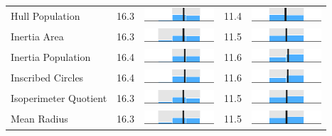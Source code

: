 \begin{table}
\begin{tabular}{l rm{7em} rm{7em}}
Hull Population        &  16.3 &       \includegraphics[width=7em]{mini_hist/IL_2008_hull_p} &  11.4 &       \includegraphics[width=7em]{mini_hist/IL_2016_hull_p} \\
Inertia Area           &  16.3 &    \includegraphics[width=7em]{mini_hist/IL_2008_inertia_a} &  11.5 &    \includegraphics[width=7em]{mini_hist/IL_2016_inertia_a} \\
Inertia Population     &  16.4 &    \includegraphics[width=7em]{mini_hist/IL_2008_inertia_p} &  11.6 &    \includegraphics[width=7em]{mini_hist/IL_2016_inertia_p} \\
Inscribed Circles      &  16.4 &    \includegraphics[width=7em]{mini_hist/IL_2008_ehrenburg} &  11.6 &    \includegraphics[width=7em]{mini_hist/IL_2016_ehrenburg} \\
Isoperimeter Quotient  &  16.3 &       \includegraphics[width=7em]{mini_hist/IL_2008_polsby} &  11.5 &       \includegraphics[width=7em]{mini_hist/IL_2016_polsby} \\
Mean Radius            &  16.3 &  \includegraphics[width=7em]{mini_hist/IL_2008_mean_radius} &  11.5 &  \includegraphics[width=7em]{mini_hist/IL_2016_mean_radius} \\

\end{tabular}
\end{table}
